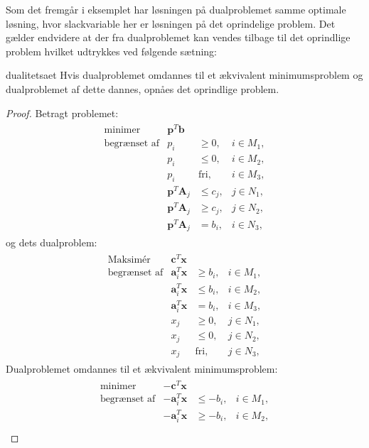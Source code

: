 Som det fremgår i eksemplet har løsningen på dualproblemet samme optimale løsning, hvor slackvariable her er løsningen på det oprindelige problem.
Det gælder endvidere at der fra dualproblemet kan vendes tilbage til det oprindlige problem hvilket udtrykkes ved følgende sætning:
\begin{thm}{}{dualitetsaet}
Hvis dualproblemet omdannes til et ækvivalent minimumsproblem og dualproblemet af dette dannes, opnåes det oprindlige problem.
\end{thm}
\begin{proof}
Betragt problemet:
\begin{align*}
\begin{array}{lrll}
\text{minimer}		&\textbf{p}^T\textbf{b}	&			&\\
\text{begrænset af}	&p_i					&\geq 0,	&i \in M_1,\\
					&p_i					&\leq 0,	&i \in M_2,\\
					&p_i					&\text{fri},	&i \in M_3,\\
					&\textbf{p}^T\textbf{A}_j	&\leq c_j,	&j \in N_1,\\
					&\textbf{p}^T\textbf{A}_j	&\geq c_j,	&j \in N_2,\\
					&\textbf{p}^T\textbf{A}_j	& = b_i,	&i \in N_3,
\end{array}
\end{align*}
og dets dualproblem:
\begin{align*}
\begin{array}{lrll}
\text{Maksimér}		&\textbf{c}^T\textbf{x}	&			&\\
\text{begrænset af}	&\textbf{a}_i^T\textbf{x}	&\geq b_i,	&i \in M_1,\\
					&\textbf{a}_i^T\textbf{x}	&\leq b_i,	&i \in M_2,\\
					&\textbf{a}_i^T\textbf{x}	& = b_i,	&i \in M_3,\\
					&x_j					&\geq 0,	&j \in N_1,\\
					&x_j					&\leq 0,	&j \in N_2,\\							&x_j					&\text{fri},	&j \in N_3,
\end{array}
\end{align*}
Dualproblemet omdannes til et ækvivalent minimumsproblem:
\begin{align*}
\begin{array}{lrll}
\text{minimer}		&-\textbf{c}^T\textbf{x}	&			&\\
\text{begrænset af}	&-\textbf{a}_i^T\textbf{x}	&\leq -b_i,	&i \in M_1,\\
					&-\textbf{a}_i^T\textbf{x}	&\geq -b_i,	&i \in M_2,\\

\end{array}
\end{align*}
\end{proof}
